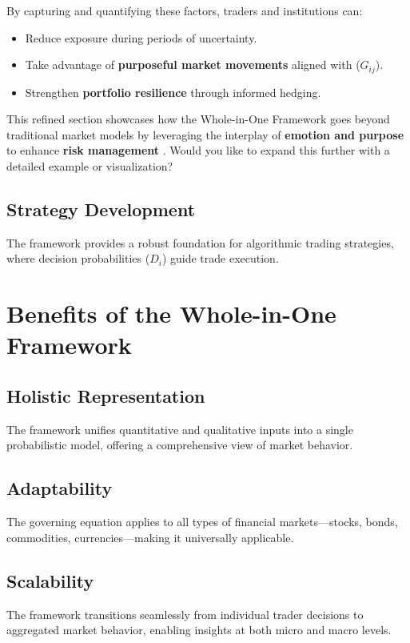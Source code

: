 \documentclass[a4]{article}
\begin{document}
By capturing and quantifying these factors, traders and institutions can:

\begin{itemize}
\item  Reduce exposure during periods of uncertainty.
\item Take advantage of {\bf purposeful market movements}  aligned with ($G_{ij}$).  
\item Strengthen {\bf portfolio resilience}  through informed hedging.
\end{itemize}

This refined section showcases how the Whole-in-One Framework goes beyond traditional market models by leveraging the interplay of {\bf emotion and purpose}  to enhance {\bf risk management} . Would you like to expand this further with a detailed example or visualization?

\subsection{Strategy Development} 
The framework provides a robust foundation for algorithmic trading strategies, where decision probabilities ($D_i$) guide trade execution.



\section{Benefits of the Whole-in-One Framework}

\subsection{Holistic Representation}
The framework unifies quantitative and qualitative inputs into a single probabilistic model, offering a comprehensive view of market behavior.

\subsection{Adaptability}
The governing equation applies to all types of financial markets---stocks, bonds, commodities, currencies---making it universally applicable.

\subsection{Scalability}
The framework transitions seamlessly from individual trader decisions to aggregated market behavior, enabling insights at both micro and macro levels.
\end{document}
